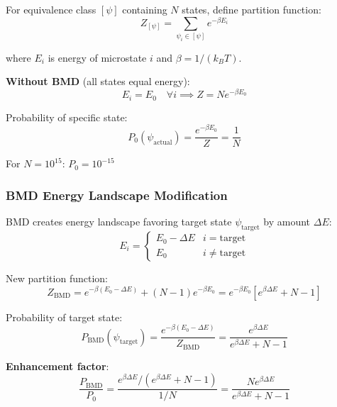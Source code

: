 \documentclass[11pt,onecolumn]{article}
\begin{document}
For equivalence class $[\psi]$ containing $N$ states, define partition function:
\begin{equation}
Z_{[\psi]} = \sum_{\psi_i \in [\psi]} e^{-\beta E_i}
\end{equation}

where $E_i$ is energy of microstate $i$ and $\beta = 1/(k_B T)$.

\textbf{Without BMD} (all states equal energy):
\begin{equation}
E_i = E_0 \quad \forall i \implies Z = N e^{-\beta E_0}
\end{equation}

Probability of specific state:
\begin{equation}
P_0(\psi_{\text{actual}}) = \frac{e^{-\beta E_0}}{Z} = \frac{1}{N}
\end{equation}

For $N = 10^{15}$: $P_0 = 10^{-15}$

\subsubsection{BMD Energy Landscape Modification}

BMD creates energy landscape favoring target state $\psi_{\text{target}}$ by amount $\Delta E$:
\begin{equation}
E_i = \begin{cases}
E_0 - \Delta E & i = \text{target} \\
E_0 & i \neq \text{target}
\end{cases}
\end{equation}

New partition function:
\begin{equation}
Z_{\text{BMD}} = e^{-\beta(E_0 - \Delta E)} + (N-1)e^{-\beta E_0} = e^{-\beta E_0}[e^{\beta\Delta E} + N - 1]
\end{equation}

Probability of target state:
\begin{equation}
P_{\text{BMD}}(\psi_{\text{target}}) = \frac{e^{-\beta(E_0 - \Delta E)}}{Z_{\text{BMD}}} = \frac{e^{\beta\Delta E}}{e^{\beta\Delta E} + N - 1}
\end{equation}

\textbf{Enhancement factor}:
\begin{equation}
\frac{P_{\text{BMD}}}{P_0} = \frac{e^{\beta\Delta E} / (e^{\beta\Delta E} + N - 1)}{1/N} = \frac{N e^{\beta\Delta E}}{e^{\beta\Delta E} + N - 1}
\end{equation}
\end{document}
